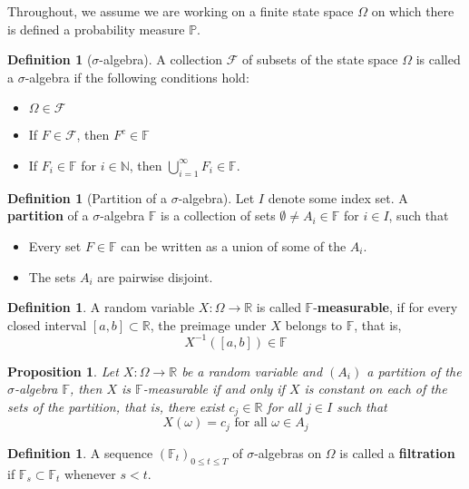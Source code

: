 \documentclass[10pt, oneside, reqno]{amsart}
\theoremstyle{plain}%
\newtheorem{prop}[thm]{Proposition}
\theoremstyle{definition}
\newtheorem{defn}[thm]{Definition}
\theoremstyle{remark}
\newcommand{\R}{\mathbb{R}}
\newcommand{\F}{\mathbb{F}}
\begin{document}
Throughout, we assume we are working on a finite state space $\Omega$ on which there is defined a probability measure $\mathbb{P}$.

\begin{defn}[$\sigma$-algebra]
	A collection $\mathcal{F}$ of subsets of the state space $\Omega$ is called a $\sigma$-algebra if the following conditions hold:
	\begin{itemize}
		\item $\Omega \in \mathcal{F}$
		\item If $F \in \mathcal{F}$, then $F^c \in \F$
		\item If $F_i \in \F$ for $i \in \mathbb{N}$, then $\bigcup_{i=1}^\infty F_i \in \F$.
	\end{itemize}
\end{defn}

\begin{defn}[Partition of a $\sigma$-algebra]
	Let $I$ denote some index set.  A \textbf{partition} of a $\sigma$-algebra $\F$ is a collection of sets $\emptyset \neq A_i \in \F$ for $i \in I$, such that 
	\begin{itemize}
		\item Every set $F \in \F$ can be written as a union of some of the $A_i$.
		\item The sets $A_i$ are pairwise disjoint.
	\end{itemize}
\end{defn}

\begin{defn}
	A random variable $X : \Omega \rightarrow \R$ is called $\F$-\textbf{measurable}, if for every closed interval $[a,b] \subset \R$, the preimage under $X$ belongs to $\F$, that is,
	\[
		X^{-1}([a,b]) \in \F
	\]
\end{defn}

\begin{prop}Let $X : \Omega \rightarrow \R$ be a random variable and $(A_i)$ a partition of the $\sigma$-algebra $\F$, then $X$ is $\F$-measurable if and only if $X$ is constant on each of the sets of the partition, that is, there exist $c_j \in \R$ for all $j \in I$ such that \[
	X(\omega) = c_j \text{ for all } \omega \in A_j
\]	
\end{prop}

\begin{defn}
	A sequence $(\F_t)_{0 \leq t \leq T}$ of $\sigma$-algebras on $\Omega$ is called a \textbf{filtration} if $\F_s \subset \F_t$ whenever $s < t$.
\end{defn}
\end{document}

